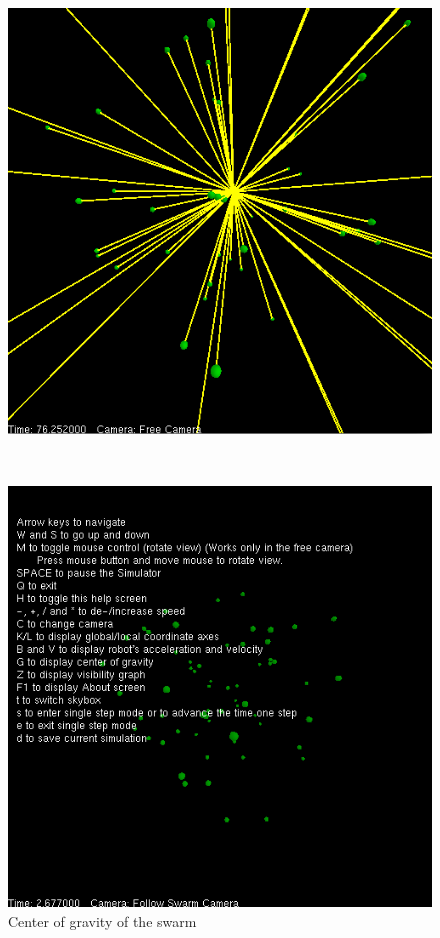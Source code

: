 \begin{figure}[ht]
	\centering
	\begin{minipage}[t]{0.46\textwidth}
		\centering
		\includegraphics[width=\textwidth]{chapter_whatitis_fig/cog.png}
		\caption{Center of gravity of the swarm}
		\label{WII:fig:cog}
	\end{minipage}$\quad$
	\begin{minipage}[t]{0.46\textwidth}
		\centering
		\includegraphics[width=\textwidth]{chapter_whatitis_fig/help-screen.png}

\end{minipage}
\end{figure}
